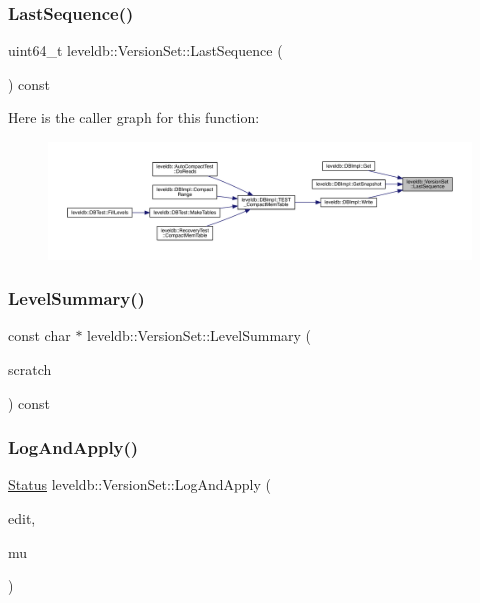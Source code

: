 \subsubsection{\texorpdfstring{LastSequence()}{LastSequence()}}
{\footnotesize\ttfamily uint64\+\_\+t leveldb\+::\+Version\+Set\+::\+Last\+Sequence (\begin{DoxyParamCaption}{ }\end{DoxyParamCaption}) const\hspace{0.3cm}{\ttfamily [inline]}}

Here is the caller graph for this function\+:
\nopagebreak
\begin{figure}[H]
\begin{center}
\leavevmode
\includegraphics[width=350pt]{classleveldb_1_1_version_set_a265fa1089536e2b66cc3cc52a2a5bc1e_icgraph}
\end{center}
\end{figure}
\mbox{\label{classleveldb_1_1_version_set_a1c49a6a2f6c6346d19d57ade22e04ee2}} 
\subsubsection{\texorpdfstring{LevelSummary()}{LevelSummary()}}
{\footnotesize\ttfamily const char $\ast$ leveldb\+::\+Version\+Set\+::\+Level\+Summary (\begin{DoxyParamCaption}\item[{\mbox{\hyperlink{structleveldb_1_1_version_set_1_1_level_summary_storage}{Level\+Summary\+Storage}} $\ast$}]{scratch }\end{DoxyParamCaption}) const}

\mbox{\label{classleveldb_1_1_version_set_ac1d014901be7095ace1aaec0cf391fb6}} 
\subsubsection{\texorpdfstring{LogAndApply()}{LogAndApply()}}
{\footnotesize\ttfamily \mbox{\hyperlink{classleveldb_1_1_status}{Status}} leveldb\+::\+Version\+Set\+::\+Log\+And\+Apply (\begin{DoxyParamCaption}\item[{\mbox{\hyperlink{classleveldb_1_1_version_edit}{Version\+Edit}} $\ast$}]{edit,  }\item[{port\+::\+Mutex $\ast$}]{mu }\end{DoxyParamCaption})}

